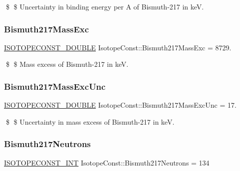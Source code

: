 \$ \$ Uncertainty in binding energy per A of Bismuth-\/217 in keV. \mbox{\label{group___isotope_const-_bismuth-_bi217_gaf9ac88a266765a22357cddb37c00228f}} 
\subsubsection{\texorpdfstring{Bismuth217\+Mass\+Exc}{Bismuth217MassExc}}
{\footnotesize\ttfamily \mbox{\hyperlink{group___isotope_const-_macros_ga8f45a7272ce02c0b4c65c44636ed719a}{I\+S\+O\+T\+O\+P\+E\+C\+O\+N\+S\+T\+\_\+\+D\+O\+U\+B\+LE}} Isotope\+Const\+::\+Bismuth217\+Mass\+Exc = 8729.}

\$ \$ Mass excess of Bismuth-\/217 in keV. \mbox{\label{group___isotope_const-_bismuth-_bi217_gac06ee3883bd6ea625a668fcbbab20b5e}} 
\subsubsection{\texorpdfstring{Bismuth217\+Mass\+Exc\+Unc}{Bismuth217MassExcUnc}}
{\footnotesize\ttfamily \mbox{\hyperlink{group___isotope_const-_macros_ga8f45a7272ce02c0b4c65c44636ed719a}{I\+S\+O\+T\+O\+P\+E\+C\+O\+N\+S\+T\+\_\+\+D\+O\+U\+B\+LE}} Isotope\+Const\+::\+Bismuth217\+Mass\+Exc\+Unc = 17.}

\$ \$ Uncertainty in mass excess of Bismuth-\/217 in keV. \mbox{\label{group___isotope_const-_bismuth-_bi217_ga3e3167689859c45f1df4df899eb65429}} 
\subsubsection{\texorpdfstring{Bismuth217\+Neutrons}{Bismuth217Neutrons}}
{\footnotesize\ttfamily \mbox{\hyperlink{group___isotope_const-_macros_ga5f18360b3e99483a35c32d789e62621c}{I\+S\+O\+T\+O\+P\+E\+C\+O\+N\+S\+T\+\_\+\+I\+NT}} Isotope\+Const\+::\+Bismuth217\+Neutrons = 134}

